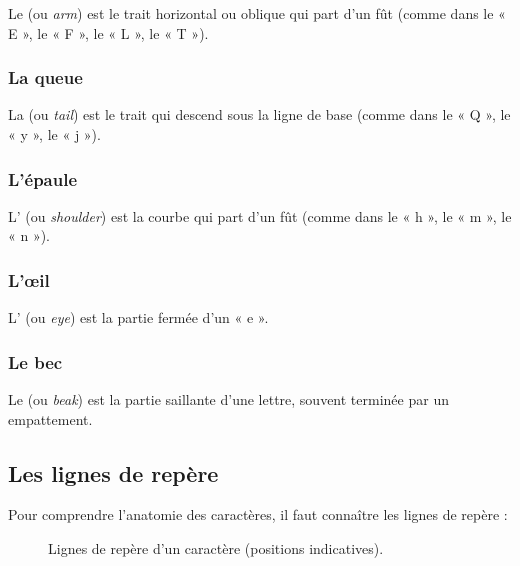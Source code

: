Le  (ou \emph{arm}) est le trait horizontal ou oblique qui part d'un fût (comme dans le « E », le « F », le « L », le « T »).

\subsubsection{La queue}

La  (ou \emph{tail}) est le trait qui descend sous la ligne de base (comme dans le « Q », le « y », le « j »).

\subsubsection{L'épaule}

L' (ou \emph{shoulder}) est la courbe qui part d'un fût (comme dans le « h », le « m », le « n »).

\subsubsection{L'œil}

L' (ou \emph{eye}) est la partie fermée d'un « e ».

\subsubsection{Le bec}

Le  (ou \emph{beak}) est la partie saillante d'une lettre, souvent terminée par un empattement.

\subsection{Les lignes de repère}

Pour comprendre l'anatomie des caractères, il faut connaître les lignes de repère :

\begin{figure}[ht]
\centering
{}
\caption{Lignes de repère d'un caractère (positions indicatives).}
\end{figure}

